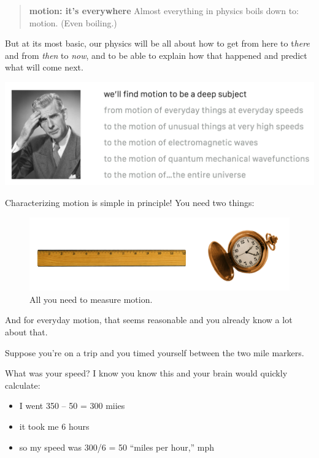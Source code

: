 \documentclass[
  letterpaper,
  DIV=11,
  numbers=noendperiod,
  oneside]{scrreprt}
\providecommand{\tightlist}{%
  \setlength{\itemsep}{0pt}\setlength{\parskip}{0pt}}\usepackage{longtable,booktabs,array}
\begin{document}
\begin{quote}
\textbf{motion: it's everywhere} Almost everything in physics boils down
to: motion. (Even boiling.)
\end{quote}

But at its most basic, our physics will be all about how to get from
here to t\emph{here} and from \emph{then} to \emph{now}, and to be able
to explain how that happened and predict what will come next.

\includegraphics[width=1\linewidth,height=\textheight,keepaspectratio]{mechanics/motion/images/clipboard-2908347734.png}

Characterizing motion is simple in principle! You need two things:

\begin{figure}[H]

{\centering \includegraphics[width=0.8\linewidth,height=\textheight,keepaspectratio]{mechanics/motion/screenshot_3644.png}

}

\caption{All you need to measure motion.}

\end{figure}%

And for everyday motion, that seems reasonable and you already know a
lot about that.

Suppose you're on a trip and you timed yourself between the two mile
markers.

What was your speed? I know you know this and your brain would quickly
calculate:

\begin{itemize}
\tightlist
\item
  I went 350 -- 50 = 300 miies
\item
  it took me 6 hours
\item
  so my speed was 300/6 = 50 ``miles per hour,'' mph
\end{itemize}
\end{document}
